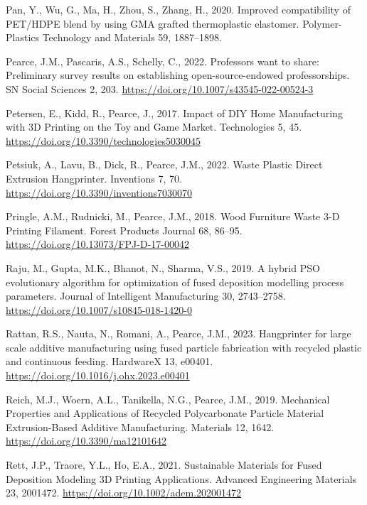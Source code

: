 \documentclass[
  12pt,
  number,
  review]{elsarticle}
\newlength{\cslhangindent}
\newlength{\cslentryspacingunit} %
\newenvironment{CSLReferences}[2] %
 {%
  \setlength{\parindent}{0pt}
  \ifodd #1
  \let\oldpar\par
  \def\par{\hangindent=\cslhangindent\oldpar}
  \fi
  \setlength{\parskip}{#2\cslentryspacingunit}
 }%
 {}
\begin{document}
\begin{CSLReferences}{1}{0}
\leavevmode{}%
Pan, Y., Wu, G., Ma, H., Zhou, S., Zhang, H., 2020. Improved
compatibility of PET/HDPE blend by using GMA grafted thermoplastic
elastomer. Polymer-Plastics Technology and Materials 59, 1887--1898.

\leavevmode{}%
Pearce, J.M., Pascaris, A.S., Schelly, C., 2022. Professors want to
share: Preliminary survey results on establishing open-source-endowed
professorships. SN Social Sciences 2, 203.
\url{https://doi.org/10.1007/s43545-022-00524-3}

\leavevmode{}%
Petersen, E., Kidd, R., Pearce, J., 2017. Impact of {DIY Home
Manufacturing} with {3D Printing} on the {Toy} and {Game Market}.
Technologies 5, 45. \url{https://doi.org/10.3390/technologies5030045}

\leavevmode{}%
Petsiuk, A., Lavu, B., Dick, R., Pearce, J.M., 2022. Waste {Plastic
Direct Extrusion Hangprinter}. Inventions 7, 70.
\url{https://doi.org/10.3390/inventions7030070}

\leavevmode{}%
Pringle, A.M., Rudnicki, M., Pearce, J.M., 2018. Wood {Furniture
Waste} 3-{D Printing Filament}. Forest
Products Journal 68, 86--95.
\url{https://doi.org/10.13073/FPJ-D-17-00042}

\leavevmode{}%
Raju, M., Gupta, M.K., Bhanot, N., Sharma, V.S., 2019. A hybrid
{PSO} evolutionary algorithm for optimization of fused
deposition modelling process parameters. Journal of Intelligent
Manufacturing 30, 2743--2758.
\url{https://doi.org/10.1007/s10845-018-1420-0}

\leavevmode{}%
Rattan, R.S., Nauta, N., Romani, A., Pearce, J.M., 2023. Hangprinter for
large scale additive manufacturing using fused particle fabrication with
recycled plastic and continuous feeding. HardwareX 13, e00401.
\url{https://doi.org/10.1016/j.ohx.2023.e00401}

\leavevmode{}%
Reich, M.J., Woern, A.L., Tanikella, N.G., Pearce, J.M., 2019.
Mechanical {Properties} and {Applications} of {Recycled Polycarbonate
Particle Material Extrusion-Based Additive Manufacturing}. Materials 12,
1642. \url{https://doi.org/10.3390/ma12101642}

\leavevmode{}%
Rett, J.P., Traore, Y.L., Ho, E.A., 2021. Sustainable {Materials} for
{Fused Deposition Modeling 3D Printing Applications}. Advanced
Engineering Materials 23, 2001472.
\url{https://doi.org/10.1002/adem.202001472}


\end{CSLReferences}
\end{document}
